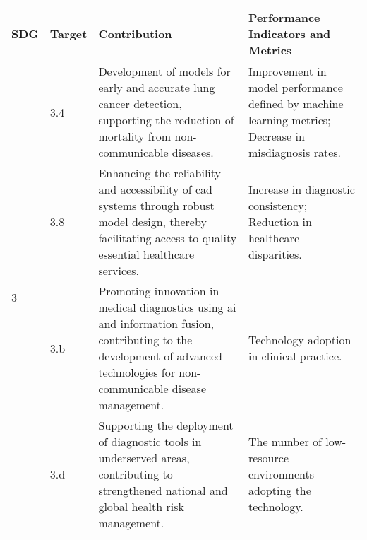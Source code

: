 \begin{center}
\begin{tabular}{|l|l|p{58mm}|p{52mm}|}
\hline
\textbf{SDG} & \textbf{Target} & \textbf{Contribution} & \textbf{Performance Indicators and Metrics} \\ 
\hline
\hline
    \multirow{4}{*}{3} 
    & 3.4 
      & Development of models for early and accurate lung cancer detection, supporting the reduction of mortality from non-communicable diseases. 
      & Improvement in model performance defined by machine learning metrics;
        Decrease in misdiagnosis rates. \\
    \cline{2-4}
    & 3.8 
      & Enhancing the reliability and accessibility of \ac{cad} systems through robust model design, thereby facilitating access to quality essential healthcare services. 
      & Increase in diagnostic consistency; Reduction in healthcare disparities. \\
    \cline{2-4}
    & 3.b 
      & Promoting innovation in medical diagnostics using \ac{ai} and information fusion, contributing to the development of advanced technologies for non-communicable disease management. 
      & Technology adoption in clinical practice. \\
    \cline{2-4}
    & 3.d 
      & Supporting the deployment of diagnostic tools in underserved areas, contributing to strengthened national and global health risk management. 
      & The number of low-resource environments adopting the technology. \\
\hline
\end{tabular}
\end{center}

